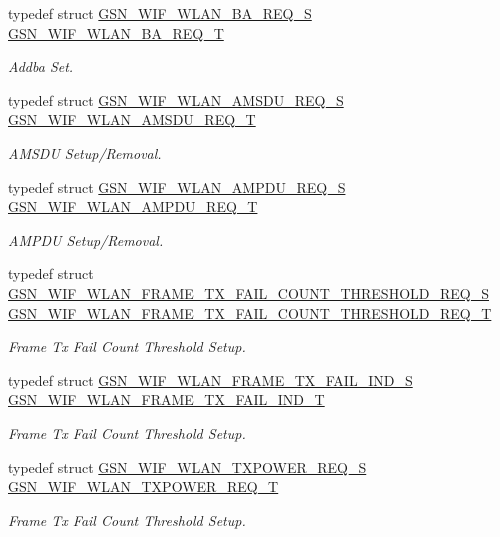 \begin{DoxyCompactItemize}
typedef struct \hyperlink{a00370}{GSN\_\-WIF\_\-WLAN\_\-BA\_\-REQ\_\-S} \hyperlink{a00677_ga9c1f7a4f3662503ec5a924804653ae43}{GSN\_\-WIF\_\-WLAN\_\-BA\_\-REQ\_\-T}
\begin{DoxyCompactList}\small\item\em Addba Set. \end{DoxyCompactList}\item 
typedef struct \hyperlink{a00367}{GSN\_\-WIF\_\-WLAN\_\-AMSDU\_\-REQ\_\-S} \hyperlink{a00677_ga3da66319027a0addea57f579e40c55a6}{GSN\_\-WIF\_\-WLAN\_\-AMSDU\_\-REQ\_\-T}
\begin{DoxyCompactList}\small\item\em AMSDU Setup/Removal. \end{DoxyCompactList}\item 
typedef struct \hyperlink{a00366}{GSN\_\-WIF\_\-WLAN\_\-AMPDU\_\-REQ\_\-S} \hyperlink{a00677_gade98eca1b34b9be5633f39a09c50f1d1}{GSN\_\-WIF\_\-WLAN\_\-AMPDU\_\-REQ\_\-T}
\begin{DoxyCompactList}\small\item\em AMPDU Setup/Removal. \end{DoxyCompactList}\item 
typedef struct \hyperlink{a00381}{GSN\_\-WIF\_\-WLAN\_\-FRAME\_\-TX\_\-FAIL\_\-COUNT\_\-THRESHOLD\_\-REQ\_\-S} \hyperlink{a00677_ga004bcfaf3fdb9825409e0ae35e69a636}{GSN\_\-WIF\_\-WLAN\_\-FRAME\_\-TX\_\-FAIL\_\-COUNT\_\-THRESHOLD\_\-REQ\_\-T}
\begin{DoxyCompactList}\small\item\em Frame Tx Fail Count Threshold Setup. \end{DoxyCompactList}\item 
typedef struct \hyperlink{a00382}{GSN\_\-WIF\_\-WLAN\_\-FRAME\_\-TX\_\-FAIL\_\-IND\_\-S} \hyperlink{a00677_ga72cc751c5634b432dbd748e5760ba9c3}{GSN\_\-WIF\_\-WLAN\_\-FRAME\_\-TX\_\-FAIL\_\-IND\_\-T}
\begin{DoxyCompactList}\small\item\em Frame Tx Fail Count Threshold Setup. \end{DoxyCompactList}\item 
typedef struct \hyperlink{a00411}{GSN\_\-WIF\_\-WLAN\_\-TXPOWER\_\-REQ\_\-S} \hyperlink{a00677_ga23625516479d19d7b54f0771fdacec4a}{GSN\_\-WIF\_\-WLAN\_\-TXPOWER\_\-REQ\_\-T}
\begin{DoxyCompactList}\small\item\em Frame Tx Fail Count Threshold Setup. \end{DoxyCompactList}\item 

\end{DoxyCompactItemize}
